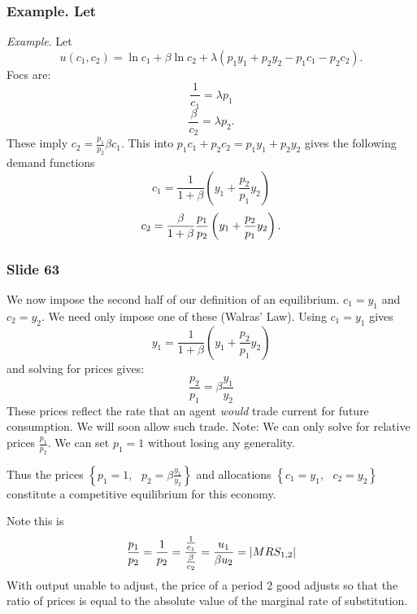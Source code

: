 \documentclass[aspectratio=169]{ltx-talk}
\begin{document}
\begin{frame}
\frametitle{Example. Let}
\textit{Example}. Let%
\begin{equation*}
u\left( c_{1},c_{2}\right) =\ln c_{1}+\beta \ln c_{2}+\lambda \left(
p_{1}y_{1}+p_{2}y_{2}-p_{1}c_{1}-p_{2}c_{2}\right) .
\end{equation*}%
Focs are:%
\begin{equation*}
\frac{1}{c_{1}}=\lambda p_{1}
\end{equation*}%
\begin{equation*}
\frac{\beta }{c_{2}}=\lambda p_{2}.
\end{equation*}%
These imply $c_{2}=\frac{p_{1}}{p_{2}}\beta c_{1}.$ This into $%
p_{1}c_{1}+p_{2}c_{2}=p_{1}y_{1}+p_{2}y_{2}$ gives the following demand
functions%
\begin{equation*}
c_{1}=\frac{1}{1+\beta }\left( y_{1}+\frac{p_{2}}{p_{1}}y_{2}\right)
\end{equation*}%
\begin{equation*}
c_{2}=\frac{\beta }{1+\beta }\frac{p_{1}}{p_{2}}\left( y_{1}+\frac{p_{2}}{%
p_{1}}y_{2}\right) .
\end{equation*}%
\end{frame}

\begin{frame}
\frametitle{Slide 63}
We now impose the second half of our definition of an equilibrium. $%
c_{1}=y_{1}$ and $c_{2}=y_{2}$. We need only impose one of these (Walras'
Law). Using $c_{1}=y_{1}$ gives 
\begin{equation*}
y_{1}=\frac{1}{1+\beta }\left( y_{1}+\frac{p_{2}}{p_{1}}y_{2}\right)
\end{equation*}%
and solving for prices gives:%
\begin{equation*}
\frac{p_{2}}{p_{1}}=\beta \frac{y_{1}}{y_{2}}
\end{equation*}%
These prices reflect the rate that an agent \textit{would} trade current for
future consumption. We will soon allow such trade. Note: We can only solve
for relative prices $\frac{p_{1}}{p_{2}}$. We can set $p_{1}=1$ without
losing any generality.

Thus the prices $\left\{ p_{1}=1,\text{ }p_{2}=\beta \frac{y_{1}}{y_{2}}%
\right\} $ and allocations $\left\{ c_{1}=y_{1},\text{ }c_{2}=y_{2}\right\} $
constitute a competitive equilibrium for this economy.

Note this is 
\begin{equation*}
\frac{p_{1}}{p_{2}}=\frac{1}{p_{2}}=\frac{\frac{1}{c_{1}}}{\frac{\beta }{%
c_{2}}}=\frac{u_{1}}{\beta u_{2}}=\left\vert MRS_{1,2}\right\vert
\end{equation*}%
With output unable to adjust, the price of a period 2 good adjusts so that
the ratio of prices is equal to the absolute value of the marginal rate of
substitution.
\end{frame}
\end{document}
